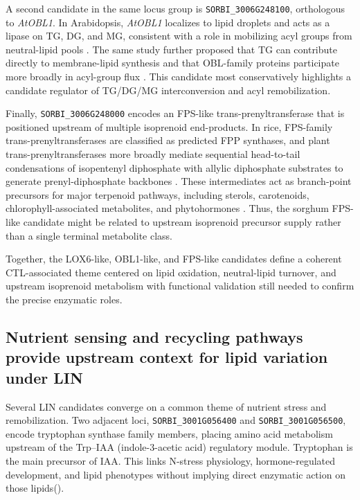 \documentclass[9pt,twocolumn,twoside]{rilabRxiv}
\begin{document}
A second candidate in the same locus group is \texttt{SORBI\_3006G248100}, orthologous to \textit{AtOBL1}. In Arabidopsis, \textit{AtOBL1} localizes to lipid droplets and acts as a lipase on TG, DG, and MG, consistent with a role in mobilizing acyl groups from neutral-lipid pools \citep{Muller2018AtOBL1}. The same study further proposed that TG can contribute directly to membrane-lipid synthesis and that OBL-family proteins participate more broadly in acyl-group flux \citep{Muller2018AtOBL1}. This candidate most conservatively highlights a candidate regulator of TG/DG/MG interconversion and acyl remobilization.

Finally, \texttt{SORBI\_3006G248000} encodes an FPS-like trans-prenyltransferase that is positioned upstream of multiple isoprenoid end-products. In rice, FPS-family trans-prenyltransferases are classified as predicted FPP synthases, and plant trans-prenyltransferases more broadly mediate sequential head-to-tail condensations of isopentenyl diphosphate with allylic diphosphate substrates to generate prenyl-diphosphate backbones \citep{Suratin2020RicePT}. These intermediates act as branch-point precursors for major terpenoid pathways, including sterols, carotenoids, chlorophyll-associated metabolites, and phytohormones \citep{Suratin2020RicePT}. Thus, the sorghum FPS-like candidate might be related to upstream isoprenoid precursor supply rather than a single terminal metabolite class.

Together, the LOX6-like, OBL1-like, and FPS-like candidates define a coherent CTL-associated theme centered on lipid oxidation, neutral-lipid turnover, and upstream isoprenoid metabolism with functional validation still needed to confirm the precise enzymatic roles.


\subsection{Nutrient sensing and recycling pathways provide upstream context for lipid variation under LIN}

Several LIN candidates converge on a common theme of nutrient stress and remobilization. Two adjacent loci, \texttt{SORBI\_3001G056400} and \texttt{SORBI\_3001G056500}, encode tryptophan synthase family members, placing amino acid metabolism upstream of the Trp–IAA (indole-3-acetic acid) regulatory module. Tryptophan is the main precursor of IAA. This links N-stress physiology, hormone-regulated development, and lipid phenotypes without implying direct enzymatic action on those lipids(\cite{Stepanova2008,Zhao2001,Fu2022,Liu2024,Wang2025}).
\end{document}
